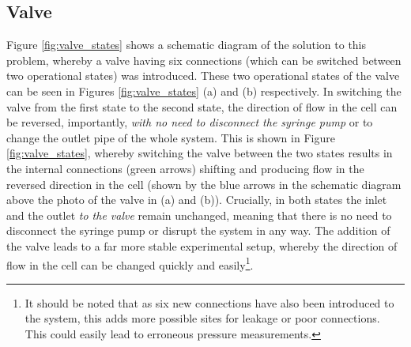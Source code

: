 \subsection{Valve}
Figure \ref{fig:valve_states} shows a schematic diagram of the solution to this problem, whereby a valve having six connections (which can be switched between two operational states) was introduced. These two operational states of the valve can be seen in Figures \ref{fig:valve_states} (a) and (b) respectively. In switching the valve from the first state to the second state, the direction of flow in the cell can be reversed, importantly, \textit{with no need to disconnect the syringe pump} or to change the outlet pipe of the whole system. This is shown in Figure \ref{fig:valve_states}, whereby switching the valve between the two states results in the internal connections (green arrows) shifting and producing flow in the reversed direction in the cell (shown by the blue arrows in the schematic diagram above the photo of the valve in (a) and (b)). Crucially, in both states the inlet and the outlet \textit{to the valve} remain unchanged, meaning that there is no need to disconnect the syringe pump or disrupt the system in any way. The addition of the valve leads to a far more stable experimental setup, whereby the direction of flow in the cell can be changed quickly and easily\footnote{It should be noted that as six new connections have also been introduced to the system, this adds more possible sites for leakage or poor connections. This could easily lead to erroneous pressure measurements.}. 

